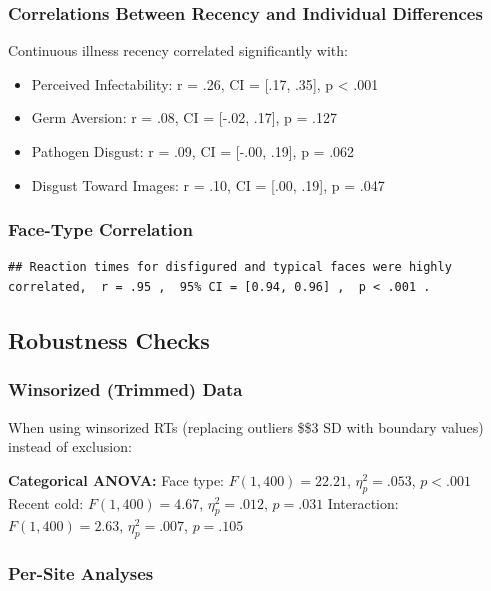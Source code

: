 \documentclass[
  english,
  man]{apa6}
\providecommand{\tightlist}{%
  \setlength{\itemsep}{0pt}\setlength{\parskip}{0pt}}
\begin{document}
\subsubsection{Correlations Between Recency and Individual Differences}\label{correlations-between-recency-and-individual-differences}

Continuous illness recency correlated significantly with:

\begin{itemize}
\tightlist
\item
  Perceived Infectability: r = .26, CI = {[}.17, .35{]}, p \textless{} .001
\item
  Germ Aversion: r = .08, CI = {[}-.02, .17{]}, p = .127
\item
  Pathogen Disgust: r = .09, CI = {[}-.00, .19{]}, p = .062
\item
  Disgust Toward Images: r = .10, CI = {[}.00, .19{]}, p = .047
\end{itemize}

\subsubsection{Face-Type Correlation}\label{face-type-correlation}

\begin{verbatim}
## Reaction times for disfigured and typical faces were highly correlated,  r = .95 ,  95% CI = [0.94, 0.96] ,  p < .001 .
\end{verbatim}

\subsection{Robustness Checks}\label{robustness-checks}

\subsubsection{Winsorized (Trimmed) Data}\label{winsorized-trimmed-data}

When using winsorized RTs (replacing outliers \$\pm\$3 SD with boundary values) instead of exclusion:

\textbf{Categorical ANOVA:}
Face type: \(F(1, 400) = 22.21\), \(\eta_{p}^{2} = .053\), \(p < .001\)
Recent cold: \(F(1, 400) = 4.67\), \(\eta_{p}^{2} = .012\), \(p = .031\)
Interaction: \(F(1, 400) = 2.63\), \(\eta_{p}^{2} = .007\), \(p = .105\)

\subsubsection{Per-Site Analyses}\label{per-site-analyses}
\end{document}
